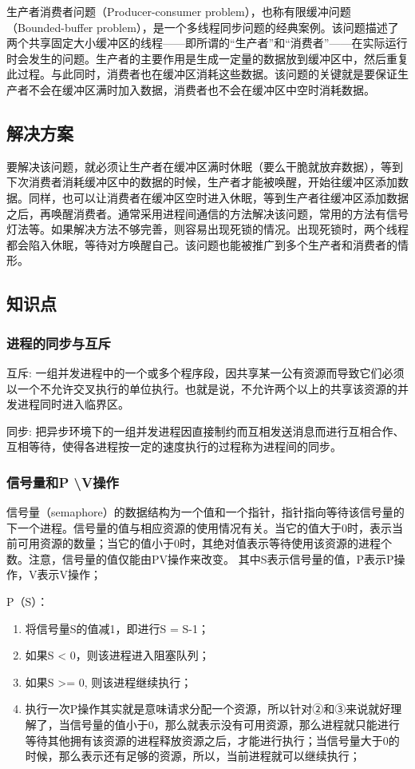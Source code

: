 \documentclass[withoutpreface,bwprint]{cumcmthesis} %
\begin{document}
生产者消费者问题（Producer-consumer problem），也称有限缓冲问题（Bounded-buffer problem），是一个多线程同步问题的经典案例。该问题描述了两个共享固定大小缓冲区的线程——即所谓的“生产者”和“消费者”——在实际运行时会发生的问题。生产者的主要作用是生成一定量的数据放到缓冲区中，然后重复此过程。与此同时，消费者也在缓冲区消耗这些数据。该问题的关键就是要保证生产者不会在缓冲区满时加入数据，消费者也不会在缓冲区中空时消耗数据。

\subsection{解决方案}

要解决该问题，就必须让生产者在缓冲区满时休眠（要么干脆就放弃数据），等到下次消费者消耗缓冲区中的数据的时候，生产者才能被唤醒，开始往缓冲区添加数据。同样，也可以让消费者在缓冲区空时进入休眠，等到生产者往缓冲区添加数据之后，再唤醒消费者。通常采用进程间通信的方法解决该问题，常用的方法有信号灯法等。如果解决方法不够完善，则容易出现死锁的情况。出现死锁时，两个线程都会陷入休眠，等待对方唤醒自己。该问题也能被推广到多个生产者和消费者的情形。

\subsection{知识点}

\subsubsection{进程的同步与互斥}
互斥: 一组并发进程中的一个或多个程序段，因共享某一公有资源而导致它们必须以一个不允许交叉执行的单位执行。也就是说，不允许两个以上的共享该资源的并发进程同时进入临界区。

同步: 把异步环境下的一组并发进程因直接制约而互相发送消息而进行互相合作、互相等待，使得各进程按一定的速度执行的过程称为进程间的同步。
\subsubsection{信号量和P \textbackslash V操作}
信号量（semaphore）的数据结构为一个值和一个指针，指针指向等待该信号量的下一个进程。信号量的值与相应资源的使用情况有关。当它的值大于0时，表示当前可用资源的数量；当它的值小于0时，其绝对值表示等待使用该资源的进程个数。注意，信号量的值仅能由PV操作来改变。
其中S表示信号量的值，P表示P操作，V表示V操作；   

P（S）：
\begin{enumerate}[itemindent=2em]  %
    \item 将信号量S的值减1，即进行S = S-1；
    \item 如果S < 0，则该进程进入阻塞队列；
    \item 如果S >= 0, 则该进程继续执行；
    \item 执行一次P操作其实就是意味请求分配一个资源，所以针对②和③来说就好理解了，当信号量的值小于0，那么就表示没有可用资源，那么进程就只能进行等待其他拥有该资源的进程释放资源之后，才能进行执行；当信号量大于0的时候，那么表示还有足够的资源，所以，当前进程就可以继续执行；

\end{enumerate}
         
\end{document}
